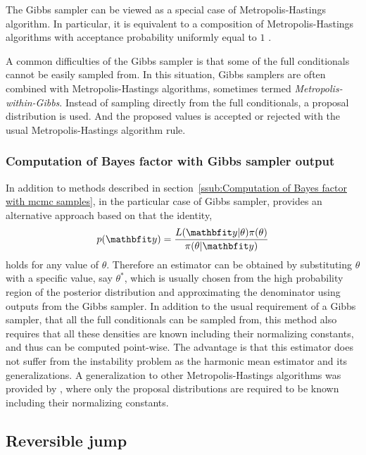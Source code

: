 The Gibbs sampler can be viewed as a special case of Metropolis-Hastings
algorithm. In particular, it is equivalent to a composition of
Metropolis-Hastings algorithms with acceptance probability uniformly equal to
$1$ \cite[][Theorem~10.13]{Robert:2004tn}.

A common difficulties of the Gibbs sampler is that some of the full
conditionals cannot be easily sampled from. In this situation, Gibbs samplers
are often combined with Metropolis-Hastings algorithms, sometimes termed
\emph{Metropolis-within-Gibbs}. Instead of sampling directly from the full
conditionals, a proposal distribution is used. And the proposed values is
accepted or rejected with the usual Metropolis-Hastings algorithm rule.

\subsubsection{Computation of Bayes factor with Gibbs sampler output}
\label{ssub:Computation of Bayes factor with Gibbs sampler output}

In addition to methods described in section~\ref{ssub:Computation of Bayes
  factor with mcmc samples}, in the particular case of Gibbs sampler,
\cite{Chib:1995em} provides an alternative approach based on that the
identity,
\begin{equation}
  p(\data) = \frac{L(\data|\theta)\pi(\theta)}{\pi(\theta|\data)}
\end{equation}
holds for any value of $\theta$. Therefore an estimator can be obtained by
substituting $\theta$ with a specific value, say $\theta^*$, which is usually
chosen from the high probability region of the posterior distribution and
approximating the denominator using outputs from the Gibbs sampler. In
addition to the usual requirement of a Gibbs sampler, that all the full
conditionals can be sampled from, this method also requires that all these
densities are known including their normalizing constants, and thus can be
computed point-wise. The advantage is that this estimator does not suffer from
the instability problem as the harmonic mean estimator and its
generalizations. A generalization to other Metropolis-Hastings algorithms was
provided by \cite{Chib:2001gq}, where only the proposal distributions are
required to be known including their normalizing constants.

\subsection{Reversible jump \protect\mcmc}
\label{sub:Reversible jump mcmc}

